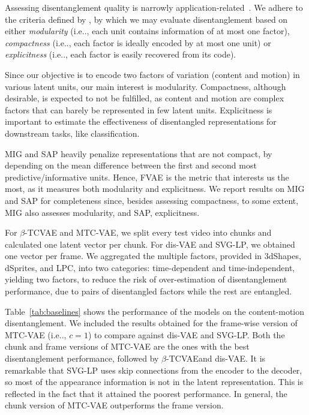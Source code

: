 \documentclass[journal]{IEEEtran}
\makeatletter
\DeclareRobustCommand\onedot{\futurelet\@let@token\@onedot}
\def\@onedot{\ifx\@let@token.\else.\null\fi\xspace}
\def\ie{{i.e}\onedot} \def\Ie{{I.e}\onedot}
\makeatother
\begin{document}
Assessing disentanglement quality is narrowly application-related~\cite{Eastwood2018,Ridgeway2018}.
We adhere to the criteria defined by \textcite{Ridgeway2018}, by which we may evaluate disentanglement based on either \emph{modularity} (\ie, each unit contains information of at most one factor), \emph{compactness} (\ie, each factor is ideally encoded by at most one unit) or \emph{explicitness} (\ie, each factor is easily recovered from its code).

Since our objective is to encode two factors of variation (content and motion) in various latent units, our main interest is modularity.
Compactness, although desirable, is expected to not be fulfilled, as content and motion are complex factors that can barely be represented in few latent units.
Explicitness is important to estimate the effectiveness of disentangled representations for downstream tasks, like classification.

MIG and SAP heavily penalize representations that are not compact, by depending on the mean difference between the first and second most predictive/informative units.
Hence, FVAE is the metric that interests us the most, as it measures both modularity and explicitness.
We report results on MIG and SAP for completeness since, besides assessing compactness, to some extent, MIG also assesses modularity, and SAP, explicitness.

For $\beta$-TCVAE and MTC-VAE, we split every test video into chunks and calculated one latent vector per chunk.
For dis-VAE and SVG-LP, we obtained one vector per frame.
We aggregated the multiple factors, provided in 3dShapes, dSprites, and LPC, into two categories: time-dependent and time-independent, yielding two factors, to reduce the risk of over-estimation of disentanglement performance, due to pairs of disentangled factors while the rest are entangled.

Table~\ref{tab:baselines} shows the performance of the models on the content-motion disentanglement.
We included the results obtained for the frame-wise version of MTC-VAE (\ie, $c=1$) to compare against dis-VAE and SVG-LP\@.
Both the chunk and frame versions of MTC-VAE are the ones with the best disentanglement performance, followed by $\beta$-TCVAE\@ and dis-VAE.
It is remarkable that SVG-LP uses skip connections from the encoder to the decoder, so most of the appearance information is not in the latent representation.
This is reflected in the fact that it attained the poorest performance.
In general, the chunk version of MTC-VAE outperforms the frame version.
\end{document}

